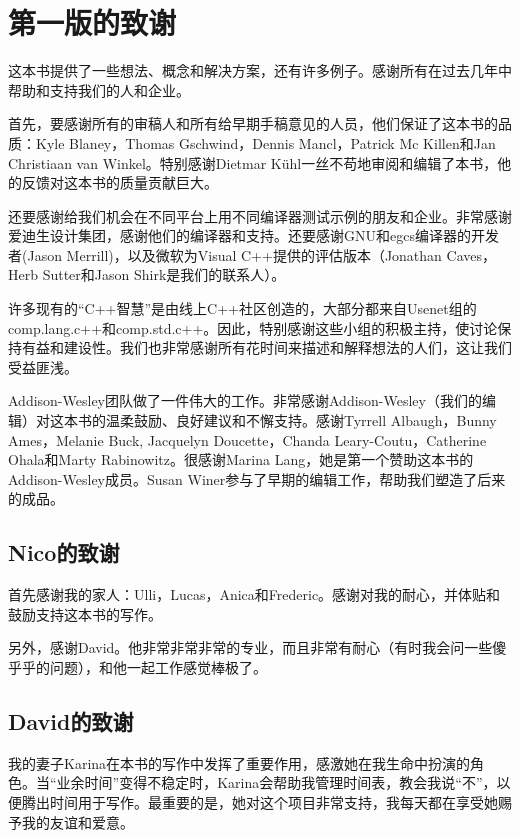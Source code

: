 \chapter{第一版的致谢}

这本书提供了一些想法、概念和解决方案，还有许多例子。感谢所有在过去几年中帮助和支持我们的人和企业。

首先，要感谢所有的审稿人和所有给早期手稿意见的人员，他们保证了这本书的品质：Kyle Blaney，Thomas Gschwind，Dennis Mancl，Patrick Mc Killen和Jan Christiaan van Winkel。特别感谢Dietmar K{\"u}hl一丝不苟地审阅和编辑了本书，他的反馈对这本书的质量贡献巨大。

还要感谢给我们机会在不同平台上用不同编译器测试示例的朋友和企业。非常感谢爱迪生设计集团，感谢他们的编译器和支持。还要感谢GNU和egcs编译器的开发者(Jason Merrill)，以及微软为Visual C++提供的评估版本（Jonathan Caves，Herb Sutter和Jason Shirk是我们的联系人）。

许多现有的“C++智慧”是由线上C++社区创造的，大部分都来自Usenet组的comp.lang.c++和comp.std.c++。因此，特别感谢这些小组的积极主持，使讨论保持有益和建设性。我们也非常感谢所有花时间来描述和解释想法的人们，这让我们受益匪浅。

Addison-Wesley团队做了一件伟大的工作。非常感谢Addison-Wesley（我们的编辑）对这本书的温柔鼓励、良好建议和不懈支持。感谢Tyrrell Albaugh，Bunny Ames，Melanie Buck, Jacquelyn Doucette，Chanda Leary-Coutu，Catherine Ohala和Marty Rabinowitz。很感谢Marina Lang，她是第一个赞助这本书的Addison-Wesley成员。Susan Winer参与了早期的编辑工作，帮助我们塑造了后来的成品。

\section*{Nico的致谢}

首先感谢我的家人：Ulli，Lucas，Anica和Frederic。感谢对我的耐心，并体贴和鼓励支持这本书的写作。

另外，感谢David。他非常非常非常的专业，而且非常有耐心（有时我会问一些傻乎乎的问题），和他一起工作感觉棒极了。

\section*{David的致谢}

我的妻子Karina在本书的写作中发挥了重要作用，感激她在我生命中扮演的角色。当“业余时间”变得不稳定时，Karina会帮助我管理时间表，教会我说“不”，以便腾出时间用于写作。最重要的是，她对这个项目非常支持，我每天都在享受她赐予我的友谊和爱意。

